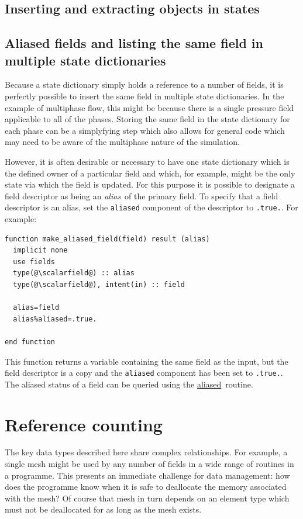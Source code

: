 \documentclass[a4paper, 11pt]{book}
\newcommand{\targetlabel}[1]{\hypertarget{#1}{}\label{#1}}
\begin{document}
\section{Inserting and extracting objects in states}



\section{Aliased fields and listing the same field in multiple state
  dictionaries}\label{sec:alias} 

Because a state dictionary simply holds a reference to a number of fields,
it is perfectly possible to insert the same field in multiple state
dictionaries. In the example of multiphase flow, this might be because there
is a single pressure field applicable to all of the phases. Storing the
same field in the state dictionary for each phase can be a simplyfying step
which also allows for general code which may need to be aware of the
multiphase nature of the simulation.

However, it is often desirable or necessary to have one state dictionary
which is the defined owner of a particular field and which, for example,
might be the only state via which the field is updated. For this purpose it
is possible to designate a field descriptor as being an \emph{alias}\ of the
primary field. To specify that a field descriptor is an alias, set the
\lstinline+aliased+ component of the descriptor to \lstinline+.true.+. For
example:
\begin{lstlisting}
function make_aliased_field(field) result (alias)
  implicit none
  use fields
  type(@\scalarfield@) :: alias 
  type(@\scalarfield@), intent(in) :: field 
  
  alias=field
  alias%aliased=.true.

end function
\end{lstlisting}
This function returns a variable containing the same field as the input, but
the field descriptor is a copy and the \lstinline+aliased+ component has
been set to \lstinline+.true.+. The aliased status of a field can be queried
using the \hyperlink{proc:aliased}{aliased}\ routine. 

\chapter{Reference counting}\targetlabel{chap:refcount}

The key data types described here share complex relationships. For example,
a single mesh might be used by any number of fields in a wide range of
routines in a programme. This presents an immediate challenge for data
management: how does the programme know when it is safe to deallocate the
memory associated with the mesh? Of course that mesh in turn depends on an
element type which must not be deallocated for as long as the mesh exists.
\end{document}
